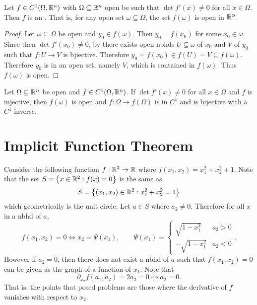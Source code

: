 \documentclass[../main.tex]{subfiles}
\begin{document}
\begin{corollary}
    Let $f \in C^1(\Omega, \mathbb{R}^n)$ with $\Omega \subseteq \mathbb{R}^n$ open be such that $\det f'(x) \neq 0$ for all $x \in \Omega$. Then $f$ is an . That is, for any open set $\omega \subseteq \Omega$, the set $f(\omega)$ is open in $\mathbb{R}^n$.
\end{corollary}

\begin{proof}
    Let $\omega \subseteq \Omega$ be open and $y_0 \in f(\omega)$. Then $y_0 = f(x_0)$ for some $x_0 \in \omega$. Since then $\det f'(x_0) \neq 0$, by  there exists open nbhds $U \subseteq \omega$ of $x_0$ and $V$ of $y_0$ such that $f : U \to V$ is bjiective. Therefore $y_0 = f(x_0) \in f(U) = V \subseteq f(\omega)$. Therefore $y_0$ is in an open set, namely $V$, which is contained in $f(\omega)$. Thus $f(\omega)$ is open.
\end{proof}

\begin{corollary}
    Let $\Omega \subseteq \mathbb{R}^n$ be open and $f \in C^1(\Omega, \mathbb{R}^n)$. If $\det f'(x) \neq 0$ for all $x \in \Omega$ and $f$ is injective, then $f(\omega)$ is open and $f : \Omega \to f(\Omega)$ is in $C^1$ and is bijective with a $C^1$ inverse.
\end{corollary}

\section[Implicit Function Thm.]{Implicit Function Theorem}

Consider the following function $f : \mathbb{R}^2 \to \mathbb{R}$ where $f(x_1, x_2) = x_1^2 + x_2^2 + 1$. Note that the set $S = \qty{x \in \mathbb{R}^2 : f(x) = 0}$ is the same as
\[
    S = \qty{(x_1, x_2) \in \mathbb{R}^2 : x_1^2 + x_2^2 = 1}
\]
which geometrically is the unit circle. Let $a \in S$ where $a_2 \neq 0$. Therefore for all $x$ in a nbhd of $a$,
\[
    f(x_1, x_2) = 0 \Leftrightarrow x_2 = \Psi(x_1), \qquad \Psi(x_1) = \begin{cases}
        \sqrt{1 - x_1^2} & a_2 > 0 \\
        -\sqrt{1 - x_1^2} & a_2 < 0
    \end{cases}
.\]
However if $a_2 = 0$, then there does not exist a nbhd of $a$ such that $f(x_1, x_2) = 0$ can be given as the graph of a function of $x_1$. Note that
\[
    \partial_{x_2} f(a_1, a_2) = 2a_2 = 0 \Leftrightarrow a_2 = 0
.\]
That is, the points that posed problems are those where the derivative of $f$ vanishes with respect to $x_2$.
\end{document}
